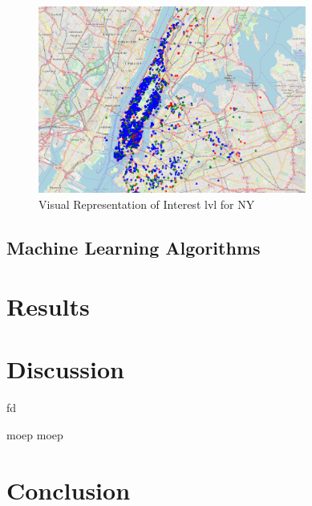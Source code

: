 \documentclass[runningheads]{llncs}
\begin{document}
    \begin{figure}[h!]
      \centering
      \includegraphics[width=250pt]{map.png}    
      \caption{Visual Representation of Interest lvl for NY}
      \label{fig:data}
    \end{figure}
    
    \newpage
    \subsection{Machine Learning Algorithms}
    
	\newpage
	\section{Results}
	
	\newpage
	\section{Discussion}
	fd

    moep moep
	\newpage
	\section{Conclusion}
	
	
	
	
	
\end{document}
